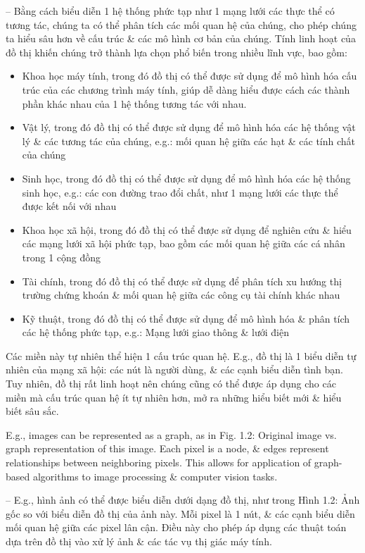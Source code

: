 \documentclass{article}
\begin{document}
\begin{itemize}
\begin{itemize}
        -- Bằng cách biểu diễn 1 hệ thống phức tạp như 1 mạng lưới các thực thể có tương tác, chúng ta có thể phân tích các mối quan hệ của chúng, cho phép chúng ta hiểu sâu hơn về cấu trúc \& các mô hình cơ bản của chúng. Tính linh hoạt của đồ thị khiến chúng trở thành lựa chọn phổ biến trong nhiều lĩnh vực, bao gồm:
        \begin{itemize}
            \item Khoa học máy tính, trong đó đồ thị có thể được sử dụng để mô hình hóa cấu trúc của các chương trình máy tính, giúp dễ dàng hiểu được cách các thành phần khác nhau của 1 hệ thống tương tác với nhau.
            \item Vật lý, trong đó đồ thị có thể được sử dụng để mô hình hóa các hệ thống vật lý \& các tương tác của chúng, e.g.: mối quan hệ giữa các hạt \& các tính chất của chúng
            \item Sinh học, trong đó đồ thị có thể được sử dụng để mô hình hóa các hệ thống sinh học, e.g.: các con đường trao đổi chất, như 1 mạng lưới các thực thể được kết nối với nhau
            \item Khoa học xã hội, trong đó đồ thị có thể được sử dụng để nghiên cứu \& hiểu các mạng lưới xã hội phức tạp, bao gồm các mối quan hệ giữa các cá nhân trong 1 cộng đồng
            \item Tài chính, trong đó đồ thị có thể được sử dụng để phân tích xu hướng thị trường chứng khoán \& mối quan hệ giữa các công cụ tài chính khác nhau
            \item Kỹ thuật, trong đó đồ thị có thể được sử dụng để mô hình hóa \& phân tích các hệ thống phức tạp, e.g.: Mạng lưới giao thông \& lưới điện
        \end{itemize}
        Các miền này tự nhiên thể hiện 1 cấu trúc quan hệ. E.g., đồ thị là 1 biểu diễn tự nhiên của mạng xã hội: các nút là người dùng, \& các cạnh biểu diễn tình bạn. Tuy nhiên, đồ thị rất linh hoạt nên chúng cũng có thể được áp dụng cho các miền mà cấu trúc quan hệ ít tự nhiên hơn, mở ra những hiểu biết mới \& hiểu biết sâu sắc.

        E.g., images can be represented as a graph, as in {\sf Fig. 1.2: Original image vs. graph representation of this image.} Each pixel is a node, \& edges represent relationships between neighboring pixels. This allows for application of graph-based algorithms to image processing \& computer vision tasks.

        -- E.g., hình ảnh có thể được biểu diễn dưới dạng đồ thị, như trong {\sf Hình 1.2: Ảnh gốc so với biểu diễn đồ thị của ảnh này.} Mỗi pixel là 1 nút, \& các cạnh biểu diễn mối quan hệ giữa các pixel lân cận. Điều này cho phép áp dụng các thuật toán dựa trên đồ thị vào xử lý ảnh \& các tác vụ thị giác máy tính.


\end{itemize}
\end{itemize}
\end{document}
